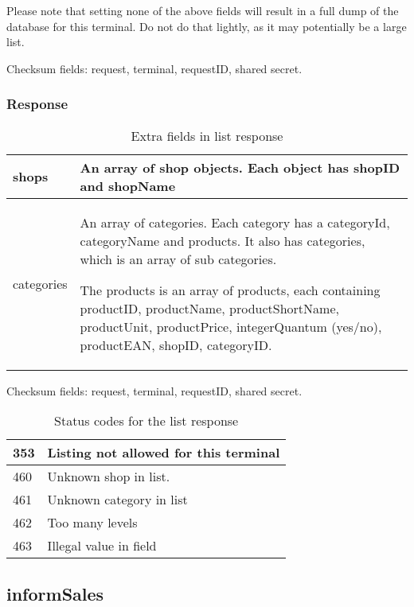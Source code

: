 \documentclass[a4paper,11pt]{article}
\newcommand{\code}[1]
   {\textsf{#1}}
\begin{document}
Please note that setting none of the above fields will result in a
full dump of the database for this terminal. Do not do that lightly,
as it may potentially be a large list. 

Checksum fields: request, terminal, requestID, shared secret.

\subsubsection{Response}
\begin{table}[!h]
  \begin{tabular}{|l|l|}
    \hline
      shops & An array of shop objects. Each object has \code{shopID} and
             \code{shopName}\\\hline
      categories & An array of categories. Each category has a
                   \code{categoryId}, \code{categoryName} and \code{products}.
                   It also has \code{categories}, which is an array of sub
                   categories.

                   The \code{products} is an array of products, each containing
                   \code{productID}, \code{productName},
                   \code{productShortName}, \code{productUnit},
                   \code{productPrice}, \code{integerQuantum} (yes/no),
                   \code{productEAN}, \code{shopID}, \code{categoryID}. \\\hline
  \end{tabular} 
  \caption{Extra fields in \code{list} response}
\end{table}

Checksum fields: request, terminal, requestID, shared secret.

\begin{table}[!h]
  \begin{tabular}{|l|l|}
    \hline
      353  & Listing not allowed for this terminal \\\hline
      460  & Unknown shop in list.\\\hline
      461  & Unknown category in list\\\hline
      462  & Too many levels\\\hline
      463  & Illegal value in field\\\hline
  \end{tabular} 
  \caption{Status codes for the \code{list} response}
\end{table}


\subsection{informSales}
\end{document}
